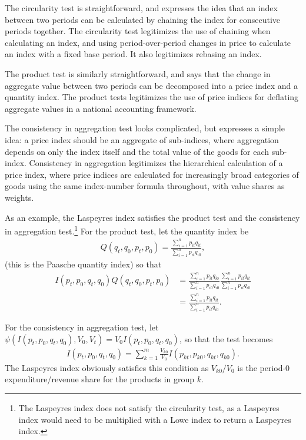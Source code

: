 \documentclass[
]{article}
\begin{document}
The circularity test is straightforward, and expresses the idea that an index between two periods can be calculated by chaining the index for consecutive periods together. The circularity test legitimizes the use of chaining when calculating an index, and using period-over-period changes in price to calculate an index with a fixed base period. It also legitimizes rebasing an index.

The product test is similarly straightforward, and says that the change in aggregate value between two periods can be decomposed into a price index and a quantity index. The product tests legitimizes the use of price indices for deflating aggregate values in a national accounting framework.

The consistency in aggregation test looks complicated, but expresses a simple idea: a price index should be an aggregate of sub-indices, where aggregation depends on only the index itself and the total value of the goods for each sub-index. Consistency in aggregation legitimizes the hierarchical calculation of a price index, where price indices are calculated for increasingly broad categories of goods using the same index-number formula throughout, with value shares as weights.

As an example, the Laspeyres index satisfies the product test and the consistency in aggregation test.\footnote{The Laspeyres index does not satisfy the circularity test, as a Laspeyres index would need to be multiplied with a Lowe index to return a Laspeyres index.} For the product test, let the quantity index be
\begin{align*}
Q(q_{t}, q_{0}, p_{t}, p_{0}) = \frac{\sum_{i = 1}^{n} p_{it}q_{it}}{\sum_{i = 1}^{n} p_{it}q_{i0}},
\end{align*}
(this is the Paasche quantity index) so that
\begin{align*}
I(p_{t}, p_{0}, q_{t}, q_{0}) Q(q_{t}, q_{0}, p_{t}, p_{0}) &= \frac{\sum_{i = 1}^{n} p_{it}q_{i0}}{\sum_{i = 1}^{n} p_{i0}q_{i0}} \frac{\sum_{i = 1}^{n} p_{it}q_{it}}{\sum_{i = 1}^{n} p_{it}q_{i0}} \\
&= \frac{\sum_{i = 1}^{n} p_{it}q_{it}}{\sum_{i = 1}^{n} p_{it}q_{i0}}.
\end{align*}

For the consistency in aggregation test, let \(\psi(I(p_{t}, p_{0}, q_{t}, q_{0}), V_{0}, V_{t}) = V_0 I(p_{t}, p_{0}, q_{t}, q_{0})\), so that the test becomes
\begin{align*}
I(p_{t}, p_{0}, q_{t}, q_{0}) = \sum_{k = 1}^{m} \frac{V_{k0}}{V_0} I(p_{kt}, p_{k0}, q_{kt}, q_{k0}).
\end{align*}
The Laspeyres index obviously satisfies this condition as \(V_{k0} / V_0\) is the period-0 expenditure/revenue share for the products in group \(k\).
\end{document}
